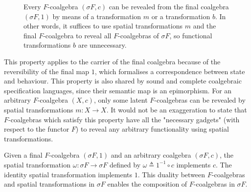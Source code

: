 \begin{figure}[t] 
    \centering
    \caption{Every $F$-coalgebra $(\sigma F, c)$ can be revealed from the final coalgebra $(\sigma F,1)$ by means of a transformation $m$ or a transformation $b$. In other words, it suffices to use spatial transformations $m$ and the final $F$-coalgebra to reveal all $F$-coalgebras of $\sigma F$, so functional transformations $b$ are unnecessary.}
    \label{fig:FinalEquivalence} 
\end{figure}
This property applies to the carrier of the final coalgebra because of the reversibility of the final map $1$, which formalises a correspondence between state and behaviour. This property is also shared by sound and complete coalgebraic specification languages, since their semantic map is an epimorphism. For an arbitrary $F$-coalgebra $(X,c)$, only some latent $F$-coalgebras can be revealed by spatial transformations $m\colon X\rightarrow X$. It would not be an exaggeration to state that $F$-coalgebras which satisfy this property have all the "necessary gadgets" (with respect to the functor $F$) to reveal any arbitrary functionality using spatial transformations. 

Given a final $F$-coalgebra $(\sigma F, 1)$ and an arbitrary coalgebra $(\sigma F, c)$, the spatial transformation $\omega\colon \sigma F\rightarrow \sigma F$ defined by $\omega\triangleq 1^{-1}\circ c$ implements $c$. The identity spatial transformation implements $1$. This duality between $F$-coalgebras and spatial transformations in $\sigma F$ enables the composition of $F$-coalgebras in $\sigma F$.

